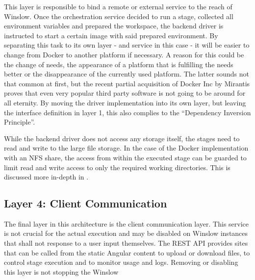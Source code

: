 This layer is responsible to bind a remote or external service to the reach of Winslow.
Once the orchestration service decided to run a stage, collected all environment variables and prepared the workspace, the backend driver is instructed to start a certain image with said prepared environment.
By separating this task to its own layer - and service in this case - it will be easier to change from Docker to another platform if necessary.
A reason for this could be the change of needs, the appearance of a platform that is fulfilling the needs better or the disappearance of the currently used platform.
The latter sounds not that common at first, but the recent partial acquisition of Docker Inc by Mirantis\cite{docker:acquisition} proves that even very popular third party software is not going to be around for all eternity.
By moving the driver implementation into its own layer, but leaving the interface definition in layer 1, this also complies to the \enquote{Dependency Inversion Principle}. 

While the backend driver does not access any storage itself, the stages need to read and write to the large file storage.
In the case of the Docker implementation with an NFS share, the access from within the executed stage can be guarded to limit read and write access to only the required working directories.
This is discussed more in-depth in .

\subsection{Layer 4: Client Communication}

The final layer in this architecture is the client communication layer.
This service is not crucial for the actual execution and may be disabled on Winslow instances that shall not response to a user input themselves.
The REST API provides sites that can be called from the static Angular content to upload or download files, to control stage execution and to monitor usage and logs.
Removing or disabling this layer is not stopping the Winslow
